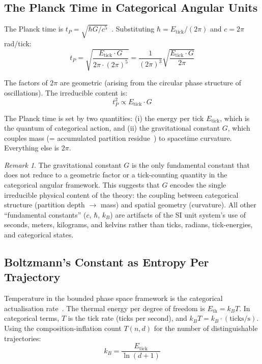 \documentclass[twocolumn,10pt,a4paper]{article}
\theoremstyle{definition}
\theoremstyle{remark}
\newtheorem{remark}[theorem]{Remark}
\begin{document}
\subsection{The Planck Time in Categorical Angular Units}

The Planck time is $t_P = \sqrt{\hbar G / c^5}$~\cite{planck1901}. Substituting $\hbar = E_{\text{tick}}/(2\pi)$ and $c = 2\pi$ rad/tick:
\begin{equation}
t_P = \sqrt{\frac{E_{\text{tick}} \cdot G}{2\pi \cdot (2\pi)^5}} = \frac{1}{(2\pi)^3}\sqrt{\frac{E_{\text{tick}} \cdot G}{2\pi}}
\label{eq:tP_angular}
\end{equation}

The factors of $2\pi$ are geometric (arising from the circular phase structure of oscillations). The irreducible content is:
\begin{equation}
\boxed{t_P^2 \propto E_{\text{tick}} \cdot G}
\label{eq:tP_irreducible}
\end{equation}

The Planck time is set by two quantities: (i) the energy per tick $E_{\text{tick}}$, which is the quantum of categorical action, and (ii) the gravitational constant $G$, which couples mass (= accumulated partition residue~\cite{sachikonye2025ion}) to spacetime curvature. Everything else is $2\pi$.

\begin{remark}
The gravitational constant $G$ is the only fundamental constant that does not reduce to a geometric factor or a tick-counting quantity in the categorical angular framework. This suggests that $G$ encodes the single irreducible physical content of the theory: the coupling between categorical structure (partition depth $\to$ mass) and spatial geometry (curvature). All other ``fundamental constants'' ($c$, $\hbar$, $k_B$) are artifacts of the SI unit system's use of seconds, meters, kilograms, and kelvins rather than ticks, radians, tick-energies, and categorical states.
\end{remark}

\subsection{Boltzmann's Constant as Entropy Per Trajectory}

Temperature in the bounded phase space framework is the categorical actualisation rate~\cite{sachikonye2025bounded}. The thermal energy per degree of freedom is $E_{\text{th}} = k_B T$. In categorical terms, $T$ is the tick rate (ticks per second), and $k_B T = k_B \cdot (\text{ticks}/\text{s})$. Using the composition-inflation count $T(n,d)$ for the number of distinguishable trajectories:
\begin{equation}
\boxed{k_B = \frac{E_{\text{tick}}}{\ln(d+1)}}
\label{eq:kB_angular}
\end{equation}
\end{document}
